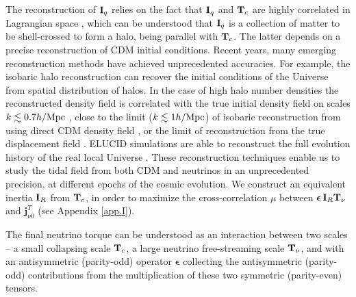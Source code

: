 \documentclass[aps,prd,twocolumn,amsmath,amssymb,amsfont,superscriptaddress,nofootinbib]{revtex4-1}
\newcommand{\bs}{\boldsymbol}
\newcommand{\T}{\bold{T}}
\newcommand{\I}{\bold{I}}
\newcommand{\spin}{\bs{j}}
\begin{document}
The reconstruction of $\I_q$ relies on the fact that $\I_q$ and $\T_c$ are highly correlated in Lagrangian space \citep{2000ApJ...532L...5L,2001ApJ...555..106L},
which can be understood that $\I_q$ is a collection of matter to be shell-crossed to form a halo, being parallel with $\T_c$.
The latter depends on a precise reconstruction of CDM initial conditions. 
Recent years, many emerging reconstruction methods have achieved unprecedented accuracies.
For example, the isobaric halo reconstruction \citep{2017PhRvD..96l3502Z,2018arXiv180706381W} can recover the initial conditions of the Universe from spatial distribution of halos.
In the case of high halo number densities the reconstructed density field is correlated with the true initial density field on scales $k\lesssim 0.7 h/{\rm Mpc}$ \citep{2017ApJ...847..110Y}, 
close to the limit ($k\lesssim 1 h/{\rm Mpc}$) of isobaric reconstruction from using direct CDM density field \citep{2017MNRAS.469.1968P}, 
or the limit of reconstruction from the true displacement field \citep{2017PhRvD..95d3501Y}. 
ELUCID simulations are able to reconstruct the full evolution history of the real local Universe \citep{2014ApJ...794...94W}. These reconstruction techniques enable us to study the tidal field from both CDM and neutrinos in an unprecedented precision, at different epochs of the cosmic evolution. We construct an equivalent inertia $\I_R$ from $\T_c$, in order to maximize the cross-correlation $\mu$ between $\bs{\epsilon}\,\I_R\T_\nu$ and $\spin^T_{\nu 0}$ (see Appendix \ref{app.I}).

The final neutrino torque can be understood as an interaction between two scales -- a small collapsing scale $\T_c$,
a large neutrino free-streaming scale $\T_\nu$,
and with an antisymmetric (parity-odd) operator $\bs{\epsilon}$ collecting the antisymmetric (parity-odd) contributions from the multiplication of these two symmetric (parity-even) tensors.

 
\end{document}

